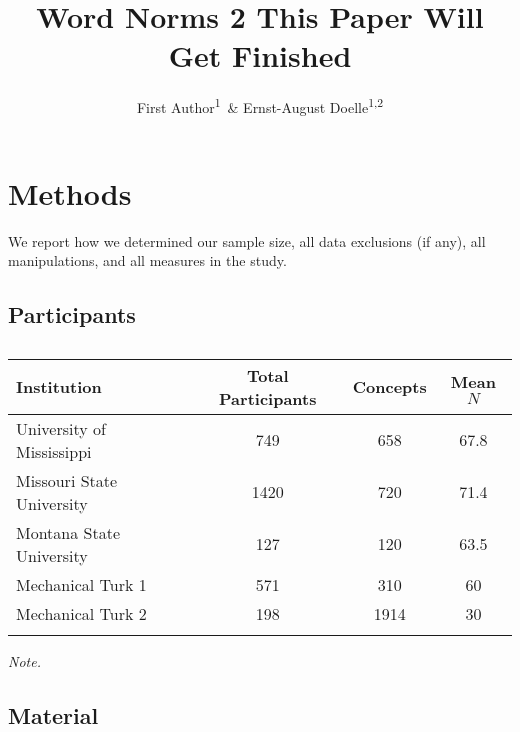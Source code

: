 \documentclass[english,man]{apa6}
\title{Word Norms 2 This Paper Will Get Finished}
\author{First Author\textsuperscript{1}~\& Ernst-August Doelle\textsuperscript{1,2}}
\affiliation{
    \vspace{0.5cm}
          \textsuperscript{1} Wilhelm-Wundt-University\\
          \textsuperscript{2} Konstanz Business School  }
\theoremstyle{definition}
\theoremstyle{definition}
\theoremstyle{definition}
\theoremstyle{remark}
\begin{document}
\maketitle

\setcounter{secnumdepth}{0}



\section{Methods}\label{methods}

We report how we determined our sample size, all data exclusions (if
any), all manipulations, and all measures in the study.

\subsection{Participants}\label{participants}

\begin{table}[tbp]
\begin{center}
\begin{threeparttable}
\caption{\label{tab:unnamed-chunk-1}}
\begin{tabular}{lccc}
\toprule
Institution & Total Participants & Concepts & Mean $N$\\
\midrule
University of Mississippi & 749 & 658 & 67.8\\
Missouri State University & 1420 & 720 & 71.4\\
Montana State University & 127 & 120 & 63.5\\
Mechanical Turk 1 & 571 & 310 & 60\\
Mechanical Turk 2 & 198 & 1914 & 30\\
\bottomrule
\addlinespace
\end{tabular}
\begin{tablenotes}[para]
\textit{Note.} 
\end{tablenotes}
\end{threeparttable}
\end{center}
\end{table}

\subsection{Material}\label{material}
\end{document}
